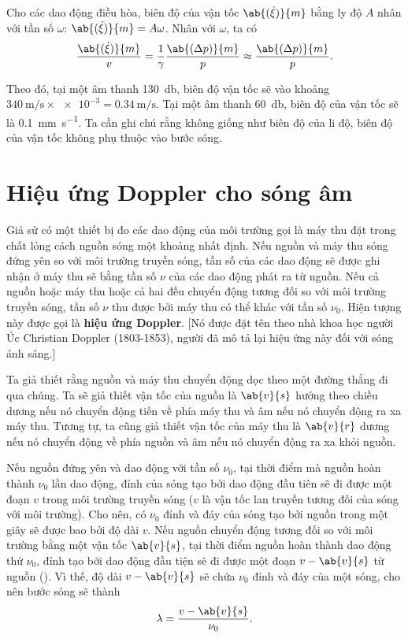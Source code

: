 Cho các dao động điều hòa, biên độ của vận tốc $\ab{(\dot{\xi})}{m}$ bằng ly độ $A$ nhân với tần số $\omega$: $\ab{(\dot{\xi})}{m} = A\omega$.
Nhân  với $\omega$, ta có
\begin{equation}\label{eq:14_76}
	\frac{\ab{(\dot{\xi})}{m}}{v} = \frac{1}{\gamma} \frac{\ab{(\Delta{p})}{m}}{p} \approx \frac{\ab{(\Delta{p})}{m}}{p}.
\end{equation}

\noindent
Theo đó, tại một âm thanh \SI{130}{\decibel}, biên độ vận tốc sẽ vào khoảng $\SI{340}{\metre\per\second}\times\num{e-3}=\SI{0.34}{\metre\per\second}$.
Tại một âm thanh \SI{60}{\decibel}, biên độ của vận tốc sẽ là \SI{0.1}{\milli\metre\per\second}.
Ta cần ghi chú rằng không giống như biên độ của li độ, biên độ của vận tốc không phụ thuộc vào bước sóng.

\section{Hiệu ứng Doppler cho sóng âm}\label{sec:14_11}

Giả sử có một thiết bị đo các dao động của môi trường gọi là máy thu đặt trong chất lỏng cách nguồn sóng một khoảng nhất định.
Nếu nguồn và máy thu sóng đứng yên so với môi trường truyền sóng, tần số của các dao động sẽ được ghi nhận ở máy thu sẽ bằng tần số $\nu$ của các dao động phát ra từ nguồn.
Nếu cả nguồn hoặc máy thu hoặc cả hai đều chuyển động tương đối so với môi trường truyền sóng, tần số $\nu$ thu được bởi máy thu có thể khác với tần số $\nu_0$.
Hiện tượng này được gọi là \textbf{hiệu ứng Doppler}. [Nó được đặt tên theo nhà khoa học người Úc Christian Doppler (1803-1853), người đã mô tả lại hiệu ứng này đối với sóng ánh sáng.]

Ta giả thiết rằng nguồn và máy thu chuyển động dọc theo một đường thẳng đi qua chúng.
Ta sẽ giả thiết vận tốc của nguồn là $\ab{v}{s}$ hướng theo chiều dương nếu nó chuyển động tiến về phía máy thu và âm nếu nó chuyển động ra xa máy thu.
Tương tự, ta cũng giả thiết vận tốc của máy thu là $\ab{v}{r}$ dương nếu nó chuyển động về phía nguồn và âm nếu nó chuyển động ra xa khỏi nguồn.

Nếu nguồn đứng yên và dao động với tần số $\nu_0$, tại thời điểm mà nguồn hoàn thành $\nu_0$ lần dao động, đỉnh của sóng tạo bởi dao động đầu tiên sẽ đi được một đoạn $v$ trong môi trường truyền sóng ($v$ là vận tốc lan truyền tương đối của sóng với môi trường).
Cho nên, có $\nu_0$ đỉnh và đáy của sóng tạo bởi nguồn trong một giây sẽ được bao bởi độ dài $v$.
Nếu nguồn chuyển động tương đối so với môi trường bằng một vận tốc $\ab{v}{s}$, tại thời điểm nguồn hoàn thành dao động thứ $\nu_0$, đỉnh tạo bởi dao động đầu tiện sẽ đi được một đoạn $v-\ab{v}{s}$ từ nguồn ().
Vì thế, độ dài $v-\ab{v}{s}$ sẽ chứa $\nu_0$ đỉnh và đáy của một sóng, cho nên bước sóng sẽ thành
\begin{equation}\label{eq:14_77}
	\lambda = \frac{v - \ab{v}{s}}{\nu_0}.
\end{equation}

